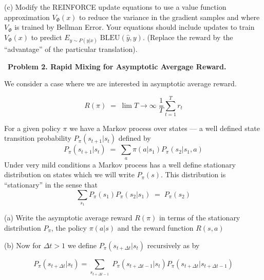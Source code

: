 \medskip
(c) Modify the REINFORCE update equations to use a value function approximation $V_\Phi(x)$ to reduce the variance in the gradient samples and where
$V_\Phi$ is trained by Bellman Error.
Your equations should include updates to train
$V_\Phi(x)$ to predict $E_{\hat{y} \sim P(y|x)}\;\mathrm{BLEU}(\hat{y},y)$.  (Replace the reward by the ``advantage'' of the particular translation).


\bigskip
~{\bf Problem 2. Rapid Mixing for Asymptotic Avergage Reward.}

\medskip
We consider a case where we are interested in asymptotic average reward.

$$R(\pi) \; = \;\lim{T \rightarrow \infty}\;\frac{1}{T} \sum_{t=1}^T r_t$$

\vfill
For a given policy $\pi$ we have a Markov process over states --- a well defined state transition probability $P_\pi(s_{t+1}|s_t)$ defined by
$$P_\pi(s_{t+1}|s_t) \;=\;\sum_a \pi(a|s_1)P_\pi(s_2|s_1,a)$$
Under very mild conditions a Markov process has a well define stationary distribution on states which we will write $P_\pi(s)$.  This distribution is ``stationary''
in the sense that
$$\sum_{s_1} P_\pi(s_1)P_\pi(s_2|s_1) \;=\;P_\pi(s_2)$$

(a) Write the asymptotic average reward $R(\pi)$ in terms of the stationary distribution $P_\pi$, the policy $\pi(a|s)$ and the reward function $R(s,a)$


(b) Now for $\Delta t >1$ we define $P_\pi(s_{t+\Delta t}|s_t)$ recursively as by

$$P_\pi(s_{t+\Delta t}|s_t) = \sum_{s_{t+\Delta t - 1}}\;P_\pi(s_{t+\Delta t-1}|s_t)P_\pi(s_{t+\Delta t}|s_{t+\Delta t -1})$$

